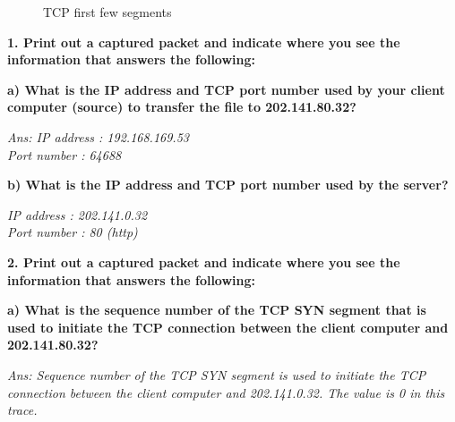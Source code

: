 \documentclass[11pt]{article}
\numberwithin{equation}{section}
\begin{document}
\begin{figure}[H]
\begin{center}
		\centering
		\caption{TCP first few segments}
		\label{fig:q1_f1_a}
\end{center}
\end{figure} 

\textbf{1. Print out a captured packet and indicate where you see the information that answers the following:} \newline

\textbf{a) What is the IP address and TCP port number used by your client computer (source) to transfer the file to 202.141.80.32? }

\textsl{Ans: IP address : 192.168.169.53 \\
Port number : 64688} \newline

\textbf{b) What is the IP address and TCP port number used by the server?} 

\textsl{IP address : 202.141.0.32 \\
Port number : 80 (http)} \newline

\textbf{2. Print out a captured packet and indicate where you see the information that answers the following:} \newline



\textbf{a) What is the sequence number of the TCP SYN segment that is used to initiate the TCP connection between the client computer and 202.141.80.32?}

\textsl{Ans: Sequence number of the TCP SYN segment is used to initiate the TCP connection between the client computer and 202.141.0.32. The value is 0 in this trace.} \newline
\end{document}
